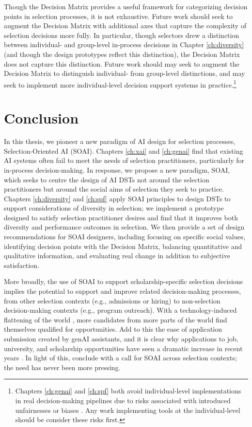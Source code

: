 Though the Decision Matrix provides a useful framework for categorizing decision points in selection processes, it is not exhaustive. Future work should seek to augment the Decision Matrix with additional axes that capture the complexity of selection decisions more fully. In particular, though selectors drew a distinction between individual- and group-level in-process decisions in Chapter \ref{ch:diversity} (and though the design prototypes reflect this distinction), the Decision Matrix does not capture this distinction. Future work should may seek to augment the Decision Matrix to distinguish individual- from group-level distinctions, and may seek to implement more individual-level decision support systems in practice.\footnote{Chapters \ref{ch:genai} and \ref{ch:spf} both avoid individual-level implementations in real decision-making pipelines due to risks associated with introduced unfairnesses or biases \cite{hartigan_fairness_1989,barocas2023fairness,pmlr-v80-kearns18a,Bastounis_Campodonico_vanderSchaar_Adcock_Hansen_2024,liang_gpt_2023}. Any work implementing tools at the individual-level should be consider these risks first.}

\section{Conclusion}
In this thesis, we pioneer a new paradigm of AI design for selection processes, Selection-Oriented AI (SOAI). Chapters \ref{ch:xai} and \ref{ch:genai} find that existing AI systems often fail to meet the needs of selection practitioners, particularly for in-process decision-making. In response, we propose a new paradigm, SOAI, which seeks to centre the design of AI DSTs not around the selection practitioners but around the social aims of selection they seek to practice. Chapters \ref{ch:diversity} and \ref{ch:spf} apply SOAI principles to design DSTs to support considerations of diversity in selection; we implement a prototype designed to satisfy selection practitioner desires and find that it improves both diversity and performance outcomes in selection. We then provide a set of design recommendations for SOAI designers, including focusing on specific social values, identifying decision points with the Decision Matrix, balancing quantitative and qualitative information, and evaluating real change in addition to subjective satisfaction.

More broadly, the use of SOAI to support scholarship-specific selection decisions implies the potential to support and improve related decision-making processes, from other selection contexts (e.g., admissions or hiring) to non-selection decision-making contexts (e.g., program outreach). With a technology-induced flattening of the world \cite{Friedman_2005}, more candidates from more parts of the world find themselves qualified for opportunities. Add to this the ease of application submission created by genAI assistants, and it is clear why applications to job, university, and scholarship opportunities have seen a dramatic increase in recent years \cite{Kaashoek2024Impact}. In light of this, conclude with a call for SOAI across selection contexts; the need has never been more pressing.
